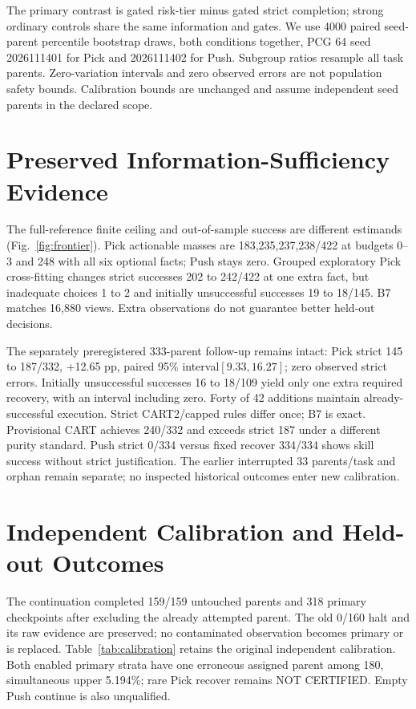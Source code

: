 \documentclass[conference]{IEEEtran}
\begin{document}
The primary contrast is gated risk-tier minus gated strict completion; strong ordinary controls share the same information and gates. We use 4000 paired seed-parent percentile bootstrap draws, both conditions together, PCG 64 seed 2026111401 for Pick and 2026111402 for Push. Subgroup ratios resample all task parents. Zero-variation intervals and zero observed errors are not population safety bounds. Calibration bounds are unchanged and assume independent seed parents in the declared scope.



\section{Preserved Information-Sufficiency Evidence}
The full-reference finite ceiling and out-of-sample success are different estimands (Fig.~\ref{fig:frontier}). Pick actionable masses are 183,235,237,238/422 at budgets 0--3 and 248 with all six optional facts; Push stays zero. Grouped exploratory Pick cross-fitting changes strict successes 202 to 242/422 at one extra fact, but inadequate choices 1 to 2 and initially unsuccessful successes 19 to 18/145. B7 matches 16,880 views. Extra observations do not guarantee better held-out decisions.

The separately preregistered 333-parent follow-up remains intact: Pick strict 145 to 187/332, +12.65 pp, paired 95\% interval$[9.33,16.27]$; zero observed strict errors. Initially unsuccessful successes 16 to 18/109 yield only one extra required recovery, with an interval including zero. Forty of 42 additions maintain already-successful execution. Strict CART2/capped rules differ once; B7 is exact. Provisional CART achieves 240/332 and exceeds strict 187 under a different purity standard. Push strict 0/334 versus fixed recover 334/334 shows skill success without strict justification. The earlier interrupted 33 parents/task and orphan remain separate; no inspected historical outcomes enter new calibration.



\section{Independent Calibration and Held-out Outcomes}
The continuation completed 159/159 untouched parents and 318 primary checkpoints after excluding the already attempted parent. The old 0/160 halt and its raw evidence are preserved; no contaminated observation becomes primary or is replaced. Table~\ref{tab:calibration} retains the original independent calibration. Both enabled primary strata have one erroneous assigned parent among 180, simultaneous upper 5.194\%; rare Pick recover remains NOT CERTIFIED. Empty Push continue is also unqualified.
\end{document}
